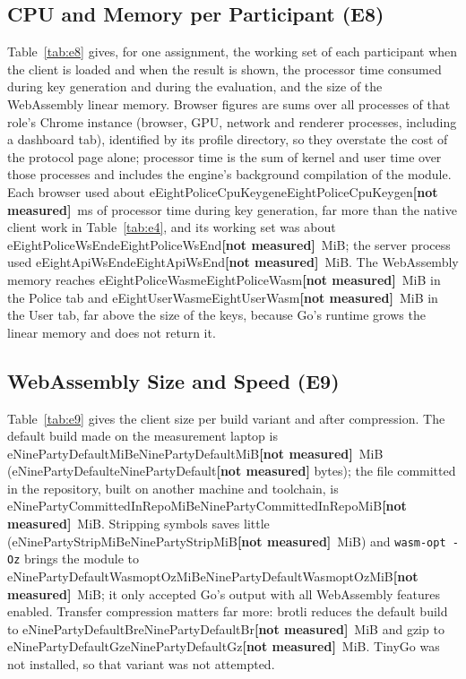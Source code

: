 \documentclass[conference,letterpaper]{IEEEtran}
\newcommand{\num}[1]{\ifcsname #1\endcsname\csname #1\endcsname\else\textbf{[not measured]}\fi}
\newcommand{\tabin}[1]{\IfFileExists{generated/#1}{\resizebox{\ifdim\width>\columnwidth\columnwidth\else\width\fi}{!}{}}{\textbf{[not measured]}}}
\begin{document}
\subsection{CPU and Memory per Participant (E8)}
Table~\ref{tab:e8} gives, for one assignment, the working set of each participant when the client is loaded and when the result is shown, the processor time consumed during key generation and during the evaluation, and the size of the WebAssembly linear memory. Browser figures are sums over all processes of that role's Chrome instance (browser, GPU, network and renderer processes, including a dashboard tab), identified by its profile directory, so they overstate the cost of the protocol page alone; processor time is the sum of kernel and user time over those processes and includes the engine's background compilation of the module. Each browser used about \num{eEightPoliceCpuKeygen}~ms of processor time during key generation, far more than the native client work in Table~\ref{tab:e4}, and its working set was about \num{eEightPoliceWsEnd}~MiB; the server process used \num{eEightApiWsEnd}~MiB. The WebAssembly memory reaches \num{eEightPoliceWasm}~MiB in the Police tab and \num{eEightUserWasm}~MiB in the User tab, far above the size of the keys, because Go's runtime grows the linear memory and does not return it.

\begin{table}[t]
\caption{Per-participant resources for one assignment (E8, median of \num{eEightReps} runs): number of processes, working set in MiB, CPU time in ms and WebAssembly memory in MiB.}
\label{tab:e8}
\centering\scriptsize
\tabin{tab_e8.tex}
\end{table}

\subsection{WebAssembly Size and Speed (E9)}
Table~\ref{tab:e9} gives the client size per build variant and after compression. The default build made on the measurement laptop is \num{eNinePartyDefaultMiB}~MiB (\num{eNinePartyDefault} bytes); the file committed in the repository, built on another machine and toolchain, is \num{eNinePartyCommittedInRepoMiB}~MiB. Stripping symbols saves little (\num{eNinePartyStripMiB}~MiB) and \texttt{wasm-opt -Oz} brings the module to \num{eNinePartyDefaultWasmoptOzMiB}~MiB; it only accepted Go's output with all WebAssembly features enabled. Transfer compression matters far more: brotli reduces the default build to \num{eNinePartyDefaultBr}~MiB and gzip to \num{eNinePartyDefaultGz}~MiB. TinyGo was not installed, so that variant was not attempted.
\end{document}
